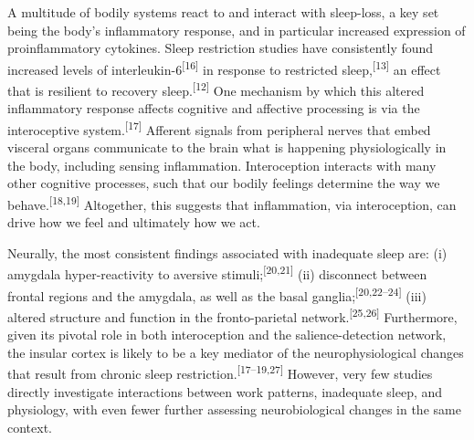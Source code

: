 \documentclass[
  english,
  man,draftall]{apa6}
\begin{document}
A multitude of bodily systems react to and interact with sleep-loss, a key set being the body's inflammatory response, and in particular increased expression of proinflammatory cytokines. Sleep restriction studies have consistently found increased levels of interleukin-6\textsuperscript{{[}16{]}} in response to restricted sleep,\textsuperscript{{[}13{]}} an effect that is resilient to recovery sleep.\textsuperscript{{[}12{]}} One mechanism by which this altered inflammatory response affects cognitive and affective processing is via the interoceptive system.\textsuperscript{{[}17{]}} Afferent signals from peripheral nerves that embed visceral organs communicate to the brain what is happening physiologically in the body, including sensing inflammation. Interoception interacts with many other cognitive processes, such that our bodily feelings determine the way we behave.\textsuperscript{{[}18,19{]}} Altogether, this suggests that inflammation, via interoception, can drive how we feel and ultimately how we act.

Neurally, the most consistent findings associated with inadequate sleep are: (i) amygdala hyper-reactivity to aversive stimuli;\textsuperscript{{[}20,21{]}} (ii) disconnect between frontal regions and the amygdala, as well as the basal ganglia;\textsuperscript{{[}20,22--24{]}} (iii) altered structure and function in the fronto-parietal network.\textsuperscript{{[}25,26{]}} Furthermore, given its pivotal role in both interoception and the salience-detection network, the insular cortex is likely to be a key mediator of the neurophysiological changes that result from chronic sleep restriction.\textsuperscript{{[}17--19,27{]}} However, very few studies directly investigate interactions between work patterns, inadequate sleep, and physiology, with even fewer further assessing neurobiological changes in the same context.
\end{document}
